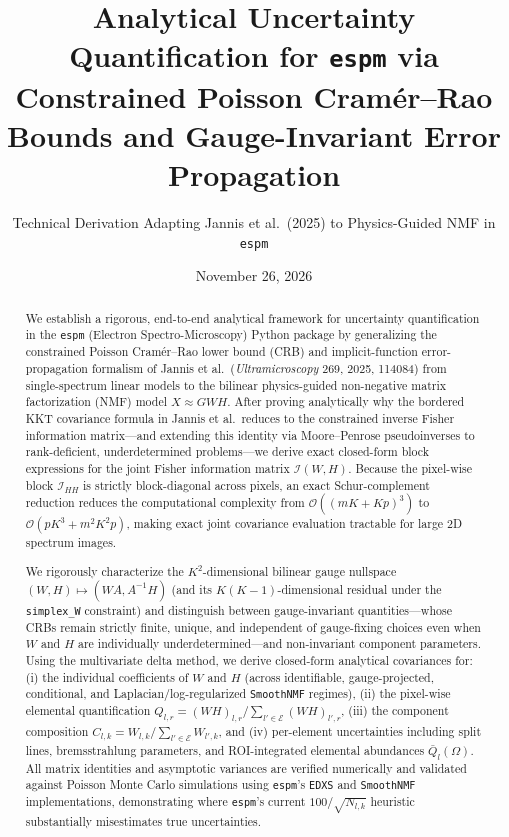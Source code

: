 \documentclass[11pt,a4paper]{article}
\title{\textbf{Analytical Uncertainty Quantification for \texttt{espm} via Constrained Poisson Cram\'er--Rao Bounds and Gauge-Invariant Error Propagation}}
\author{Technical Derivation Adapting Jannis et al.\ (2025) to Physics-Guided NMF in \texttt{espm}}
\date{November 26, 2026}
\theoremstyle{plain}
\theoremstyle{definition}
\theoremstyle{remark}
\newcommand{\E}{\mathcal{E}}
\newcommand{\cI}{\mathcal{I}}
\begin{document}
\maketitle

\begin{abstract}
We establish a rigorous, end-to-end analytical framework for uncertainty quantification in the \texttt{espm} (Electron Spectro-Microscopy) Python package by generalizing the constrained Poisson Cram\'er--Rao lower bound (CRB) and implicit-function error-propagation formalism of Jannis et al.\ (\emph{Ultramicroscopy} 269, 2025, 114084) from single-spectrum linear models to the bilinear physics-guided non-negative matrix factorization (NMF) model $X \approx GWH$. After proving analytically why the bordered KKT covariance formula in Jannis et al.\ reduces to the constrained inverse Fisher information matrix—and extending this identity via Moore--Penrose pseudoinverses to rank-deficient, underdetermined problems—we derive exact closed-form block expressions for the joint Fisher information matrix $\cI(W,H)$. Because the pixel-wise block $\cI_{HH}$ is strictly block-diagonal across pixels, an exact Schur-complement reduction reduces the computational complexity from $\mathcal{O}((mK + Kp)^3)$ to $\mathcal{O}(p K^3 + m^2 K^2 p)$, making exact joint covariance evaluation tractable for large 2D spectrum images.

We rigorously characterize the $K^2$-dimensional bilinear gauge nullspace $(W,H) \mapsto (WA, A^{-1}H)$ (and its $K(K-1)$-dimensional residual under the \texttt{simplex\_W} constraint) and distinguish between gauge-invariant quantities—whose CRBs remain strictly finite, unique, and independent of gauge-fixing choices even when $W$ and $H$ are individually underdetermined—and non-invariant component parameters. Using the multivariate delta method, we derive closed-form analytical covariances for: (i) the individual coefficients of $W$ and $H$ (across identifiable, gauge-projected, conditional, and Laplacian/log-regularized \texttt{SmoothNMF} regimes), (ii) the pixel-wise elemental quantification $Q_{l,r} = (WH)_{l,r} / \sum_{l'\in\E} (WH)_{l',r}$, (iii) the component composition $C_{l,k} = W_{l,k} / \sum_{l'\in\E} W_{l',k}$, and (iv) per-element uncertainties including split lines, bremsstrahlung parameters, and ROI-integrated elemental abundances $\bar{Q}_l(\Omega)$. All matrix identities and asymptotic variances are verified numerically and validated against Poisson Monte Carlo simulations using \texttt{espm}'s \texttt{EDXS} and \texttt{SmoothNMF} implementations, demonstrating where \texttt{espm}'s current $100/\sqrt{N_{l,k}}$ heuristic substantially misestimates true uncertainties.
\end{abstract}
\end{document}
